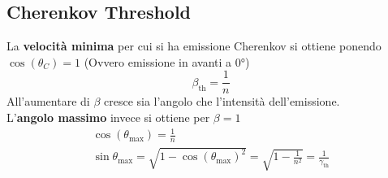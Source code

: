 \subsection{Cherenkov Threshold}
La \textbf{velocità minima}  per cui si ha emissione Cherenkov si ottiene ponendo $\cos(\theta_C)=1$ (Ovvero emissione in avanti a $0°$)
\[\beta_\text{th}=\frac{1}{n}\]
All'aumentare di $\beta$ cresce sia l'angolo che l'intensità dell'emissione.\\ 
L'\textbf{angolo massimo}  invece si ottiene per $\beta=1$
\[\begin{gathered}
    \cos(\theta_\text{max})=\frac{1}{n}
\\ 
\sin\theta_\text{max}=\sqrt{1-\cos(\theta_\text{max})^2}=\sqrt{1-\frac{1}{n^2}}=\frac{1}{\gamma_\text{th}}
\end{gathered}\]

